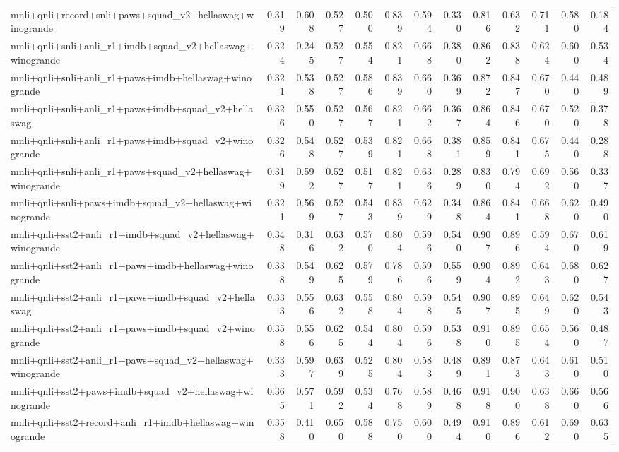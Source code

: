\begin{table}[t]
\begin{tabular}{lrrrrrrrrrrrr}
    mnli+qnli+record+snli+paws+squad\_v2+hellaswag+winogrande & 0.319 & 0.608 & 0.527 & 0.500 & 0.839 & 0.594 & 0.330 & 0.816 & 0.632 & 0.711 & 0.580 & 0.184 \\
    mnli+qnli+snli+anli\_r1+imdb+squad\_v2+hellaswag+winogrande & 0.324 & 0.245 & 0.527 & 0.554 & 0.821 & 0.668 & 0.380 & 0.862 & 0.838 & 0.624 & 0.600 & 0.534 \\
    mnli+qnli+snli+anli\_r1+paws+imdb+hellaswag+winogrande & 0.321 & 0.538 & 0.527 & 0.586 & 0.839 & 0.660 & 0.369 & 0.872 & 0.847 & 0.670 & 0.440 & 0.489 \\
    mnli+qnli+snli+anli\_r1+paws+imdb+squad\_v2+hellaswag & 0.326 & 0.550 & 0.527 & 0.567 & 0.821 & 0.662 & 0.367 & 0.864 & 0.846 & 0.670 & 0.520 & 0.378 \\
    mnli+qnli+snli+anli\_r1+paws+imdb+squad\_v2+winogrande & 0.326 & 0.548 & 0.527 & 0.539 & 0.821 & 0.668 & 0.381 & 0.859 & 0.841 & 0.675 & 0.440 & 0.288 \\
    mnli+qnli+snli+anli\_r1+paws+squad\_v2+hellaswag+winogrande & 0.319 & 0.592 & 0.527 & 0.517 & 0.821 & 0.636 & 0.289 & 0.830 & 0.794 & 0.692 & 0.560 & 0.337 \\
    mnli+qnli+snli+paws+imdb+squad\_v2+hellaswag+winogrande & 0.321 & 0.569 & 0.527 & 0.543 & 0.839 & 0.629 & 0.348 & 0.864 & 0.841 & 0.668 & 0.620 & 0.490 \\
    mnli+qnli+sst2+anli\_r1+imdb+squad\_v2+hellaswag+winogrande & 0.348 & 0.316 & 0.632 & 0.570 & 0.804 & 0.596 & 0.540 & 0.907 & 0.896 & 0.594 & 0.670 & 0.619 \\
    mnli+qnli+sst2+anli\_r1+paws+imdb+hellaswag+winogrande & 0.338 & 0.549 & 0.625 & 0.579 & 0.786 & 0.596 & 0.559 & 0.904 & 0.892 & 0.643 & 0.680 & 0.627 \\
    mnli+qnli+sst2+anli\_r1+paws+imdb+squad\_v2+hellaswag & 0.333 & 0.556 & 0.632 & 0.558 & 0.804 & 0.598 & 0.545 & 0.907 & 0.895 & 0.649 & 0.620 & 0.543 \\
    mnli+qnli+sst2+anli\_r1+paws+imdb+squad\_v2+winogrande & 0.358 & 0.556 & 0.625 & 0.544 & 0.804 & 0.596 & 0.538 & 0.910 & 0.895 & 0.654 & 0.560 & 0.487 \\
    mnli+qnli+sst2+anli\_r1+paws+squad\_v2+hellaswag+winogrande & 0.333 & 0.597 & 0.639 & 0.525 & 0.804 & 0.583 & 0.489 & 0.891 & 0.873 & 0.643 & 0.610 & 0.510 \\
    mnli+qnli+sst2+paws+imdb+squad\_v2+hellaswag+winogrande & 0.365 & 0.571 & 0.592 & 0.534 & 0.768 & 0.589 & 0.468 & 0.918 & 0.900 & 0.638 & 0.660 & 0.566 \\
    mnli+qnli+sst2+record+anli\_r1+imdb+hellaswag+winogrande & 0.358 & 0.410 & 0.650 & 0.588 & 0.750 & 0.600 & 0.494 & 0.910 & 0.896 & 0.612 & 0.690 & 0.635 \\

\end{tabular}
\end{table}

